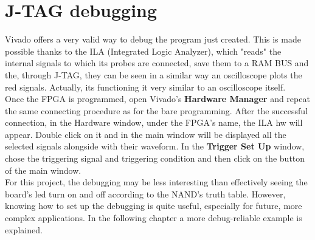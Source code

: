 \section{J-TAG debugging}
Vivado offers a very valid way to debug the program just created. This is made possible thanks to the ILA (Integrated Logic Analyzer), which "reads" the internal signals to which its probes are connected, save them to a RAM BUS and the, through J-TAG, they can be seen in a similar way an oscilloscope plots the red signals. Actually, its functioning it very similar to an oscilloscope itself.
\bigskip
\\Once the FPGA is programmed, open Vivado's \textbf{Hardware Manager} and repeat the same connecting procedure as for the bare programming. After the successful connection, in the Hardware window, under the FPGA's name, the ILA hw will appear. Double click on it and in the main window will be displayed all the selected signals alongside with their waveform. In the \textbf{Trigger Set Up} window, chose the triggering signal and triggering condition and then click on the  button of the main window. 
\bigskip
\\For this project, the debugging may be less interesting than effectively seeing the board's led turn on and off according to the NAND's truth table. However, knowing how to set up the debugging is quite useful, especially for future, more complex applications. In the following chapter a more debug-reliable example is explained.